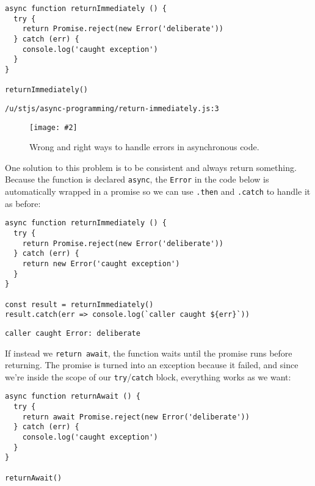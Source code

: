 \documentclass[krantzl]{krantz}
\newcommand{\figpdf}[4]{\begin{figure}%
\centering%
\texttt{[image: \#2]}%
\caption{#3}%
\label{#1}%
\end{figure}}
\begin{document}
\begin{lstlisting}[frame=single,frameround=tttt]
async function returnImmediately () {
  try {
    return Promise.reject(new Error('deliberate'))
  } catch (err) {
    console.log('caught exception')
  }
}

returnImmediately()
\end{lstlisting}



\begin{lstlisting}[frame=single,frameround=tttt]
/u/stjs/async-programming/return-immediately.js:3
\end{lstlisting}


\figpdf{async-programming-handling-errors}{./async-programming/handling-errors.pdf}{Wrong and right ways to handle errors in asynchronous code.}{0.6}


One solution to this problem is to be consistent and always return something.
Because the function is declared \texttt{async},
the \texttt{Error} in the code below is automatically wrapped in a promise
so we can use \texttt{.then} and \texttt{.catch} to handle it as before:


\begin{lstlisting}[frame=single,frameround=tttt]
async function returnImmediately () {
  try {
    return Promise.reject(new Error('deliberate'))
  } catch (err) {
    return new Error('caught exception')
  }
}

const result = returnImmediately()
result.catch(err => console.log(`caller caught ${err}`))
\end{lstlisting}



\begin{lstlisting}[frame=single,frameround=tttt]
caller caught Error: deliberate
\end{lstlisting}



If instead we \texttt{return await},
the function waits until the promise runs before returning.
The promise is turned into an exception because it failed,
and since we're inside the scope of our \texttt{try}/\texttt{catch} block,
everything works as we want:


\begin{lstlisting}[frame=single,frameround=tttt]
async function returnAwait () {
  try {
    return await Promise.reject(new Error('deliberate'))
  } catch (err) {
    console.log('caught exception')
  }
}

returnAwait()
\end{lstlisting}
\end{document}
